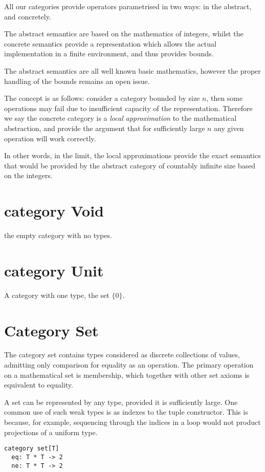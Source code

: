 \documentclass[oneside]{book}
\theoremstyle{plain}
\theoremstyle{definition}
\theoremstyle{plain}
\begin{document}
All our categories provide operators parametrised in two ways:
in the abstract, and concretely.

The abstract semantics are based on the mathematics of integers,
whilst the concrete semantics provide a representation which
allows the actual implementation in a finite environment,
and thus provides bounds.

The abstract semantics are all well known basic mathematics,
however the proper handling of the bounds remains an open issue.

The concept is as follows: consider a category bounded by size $n$,
then some operations may fail due to insufficient capacity of
the representation. Therefore we say the concrete category is 
a {\em local approximation} to the mathematical abstraction,
and provide the argument that for sufficiently large $n$ any
given operation will work correctly.

In other words, in the limit, the local approximations provide
the exact semantics that would be provided by the abstract category
of countably infinite size based on the integers.

\section{category Void}
the empty category with no types.

\section{category Unit}
A category with one type, the set $\{0\}$.

\section{Category Set}
The category set contains types considered as discrete collections
of values, admitting only comparison for equality as an operation.
The primary operation on a mathematical set is membership, which together
with other set axioms is equivalent to equality.

A set can be represented by any type, provided it is sufficiently large.
One common use of such weak types is as indexes to the tuple constructor.
This is because, for example, sequencing through the indices in a loop
would not product projections of a uniform type.

\begin{verbatim}
category set[T]
  eq: T * T -> 2
  ne: T * T -> 2
\end{verbatim}
\end{document}
